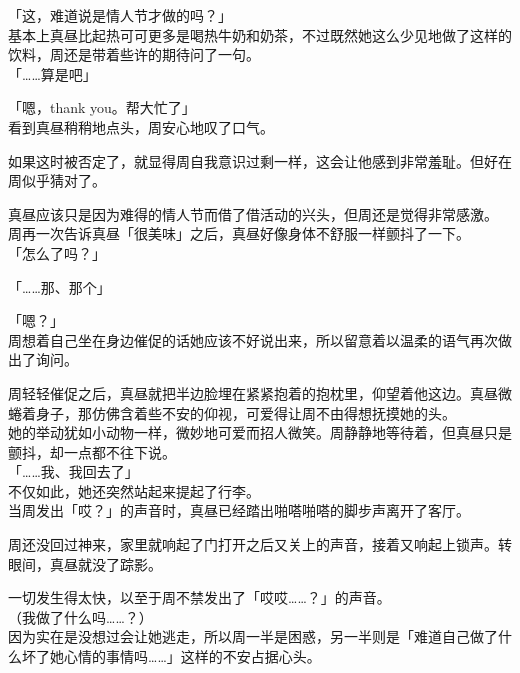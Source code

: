 「这，难道说是情人节才做的吗？」\\

基本上真昼比起热可可更多是喝热牛奶和奶茶，不过既然她这么少见地做了这样的饮料，周还是带着些许的期待问了一句。\\

「……算是吧」

「嗯，thank you。帮大忙了」\\

看到真昼稍稍地点头，周安心地叹了口气。

如果这时被否定了，就显得周自我意识过剩一样，这会让他感到非常羞耻。但好在周似乎猜对了。

真昼应该只是因为难得的情人节而借了借活动的兴头，但周还是觉得非常感激。\\

周再一次告诉真昼「很美味」之后，真昼好像身体不舒服一样颤抖了一下。\\

「怎么了吗？」

「……那、那个」

「嗯？」\\

周想着自己坐在身边催促的话她应该不好说出来，所以留意着以温柔的语气再次做出了询问。

周轻轻催促之后，真昼就把半边脸埋在紧紧抱着的抱枕里，仰望着他这边。真昼微蜷着身子，那仿佛含着些不安的仰视，可爱得让周不由得想抚摸她的头。\\

她的举动犹如小动物一样，微妙地可爱而招人微笑。周静静地等待着，但真昼只是颤抖，却一点都不往下说。\\

「……我、我回去了」\\

不仅如此，她还突然站起来提起了行李。\\

当周发出「哎？」的声音时，真昼已经踏出啪嗒啪嗒的脚步声离开了客厅。

周还没回过神来，家里就响起了门打开之后又关上的声音，接着又响起上锁声。转眼间，真昼就没了踪影。

一切发生得太快，以至于周不禁发出了「哎哎……？」的声音。\\

（我做了什么吗……？）\\

因为实在是没想过会让她逃走，所以周一半是困惑，另一半则是「难道自己做了什么坏了她心情的事情吗……」这样的不安占据心头。\\

